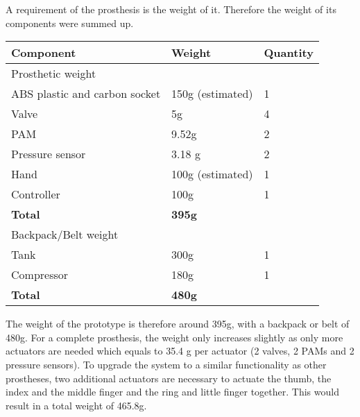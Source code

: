\documentclass[main]{subfiles}
\begin{document}
A requirement of the prosthesis is the weight of it. Therefore the weight of its components were summed up.

\begin{table}[H]
\scriptsize
\centering
\begin{tabular}{lll}
\toprule
Component & Weight & Quantity\\
\midrule
Prosthetic weight & &\\
\hline
ABS plastic and carbon socket & 150g (estimated) & 1\\
Valve & 5g & 4\\
PAM & 9.52g & 2 \\
Pressure sensor & 3.18 g & 2\\
Hand & 100g (estimated) & 1\\
Controller & 100g & 1 \\
\midrule
\textbf{Total} & \textbf{395g} & \\
\hline
Backpack/Belt weight & &\\
\hline
Tank & 300g & 1\\
Compressor & 180g & 1\\
\midrule
\textbf{Total} & \textbf{480g} & \\
\end{tabular}
\label{weight-table}
\normalsize
\end{table}

The weight of the prototype is therefore around 395g, with a backpack or belt of 480g. For a complete prosthesis, the weight only increases slightly as only more actuators are needed which equals to 35.4 g per actuator (2 valves, 2 PAMs and 2 pressure sensors). To upgrade the system to a similar functionality as other prostheses, two additional actuators are necessary to actuate the thumb, the index and the middle finger and the ring and little finger together. This would result in a total weight of 465.8g.
\end{document}
